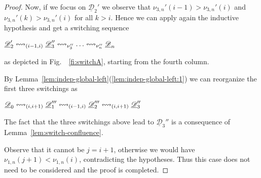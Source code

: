 \documentclass[a4paper,UKenglish,cleveref,pdftex,thm-restate,numberwithinsect,anonymous]{lipics}
\newcommand{\dder}[1]{\mathscr{#1}}
\newcommand{\der}[1]{\underline{\dder{#1}}}
\newcommand{\shift}[1]{\ensuremath{\mathrel{{\leftrightsquigarrow}_{#1}}}}
\begin{document}
\begin{proof}
  Now, if we focus on $\der{D}_2'$ we observe that
  $\nu_{3,n}'(i-1) > \nu_{3,n}'(i)$ and
  $\nu_{3,n}'(k) > \nu_{3,n}'(i)$ for all $k > i$. Hence we can apply
  again the inductive hypothesis and get a switching sequence
    \begin{center}
    $\der{D}_2' \shift{\transp{i-1}[i]} \der{D}_3'' \shift{\nu_3''} \ldots
    \shift{\nu_n''} \der{D}_n$
  \end{center}
  as depicted in Fig.~~\ref{fi:switchA}, starting from the fourth column.

  By Lemma~\ref{lem:indep-global-left}(\ref{lem:indep-global-left:1}) we can
  reorganize the first three switchings as

  \begin{center}
    $\der{D}_0 \shift{\transp{i}} \der{D}_1'''
    \shift{\transp{i-1}[i]} \der{D}_2'''
    \shift{\transp{i}} \der{D}_3''$
  \end{center}

  The fact that the three switchings above lead to $\der{D}_3''$ is a
  consequence of Lemma~\ref{lem:switch-confluence}.

  \bigskip

  Observe that it cannot be $j=i+1$, otherwise we would have
  $\nu_{1,n}(j+1) < \nu_{1,n}(i)$, contradicting the hypotheses. Thus
  this case does not need to be considered and the proof is completed.  
\end{proof}
 
\end{document}
